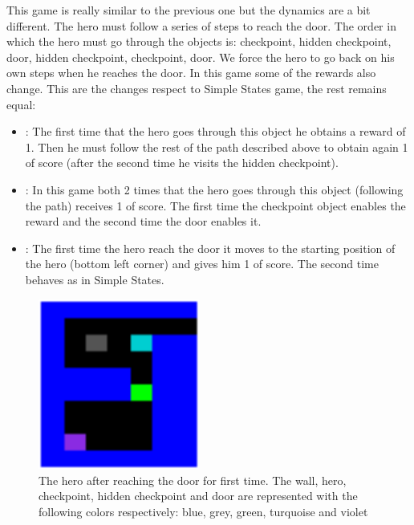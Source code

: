 This game is really similar to the previous one but the dynamics are a bit different.
The hero must follow a series of steps to reach the door.
The order in which the hero must go through the objects is: checkpoint, hidden checkpoint, door, hidden checkpoint,
checkpoint, door.
We force the hero to go back on his own steps when he reaches the door.
In this game some of the rewards also change.
This are the changes respect to Simple States game, the rest remains equal:
\begin{itemize}
    \item {}: The first time that the hero goes through this object he obtains a reward of 1.
    Then he must follow the rest of the path described above to obtain again 1 of score (after the second time he visits the hidden checkpoint).
    \item {}: In this game both 2 times that the hero goes through this object
    (following the path) receives 1 of score.
    The first time the checkpoint object enables the reward and the second time the door enables it.
    \item {}: The first time the hero reach the door it moves to the starting position of the hero (bottom left corner)
    and gives him 1 of score.
    The second time behaves as in Simple States.
\end{itemize}

\begin{figure}[hbtp]
\begin{center}
\includegraphics[width=200]{img/ComplexStates_going_back.png}
\end{center}
\caption[Complex States game]
{The hero after reaching the door for first time. The wall, hero, checkpoint, hidden checkpoint
and door are represented with the following colors respectively: blue, grey, green, turquoise and violet}
\label{fig:ComplexStates}
\end{figure}


